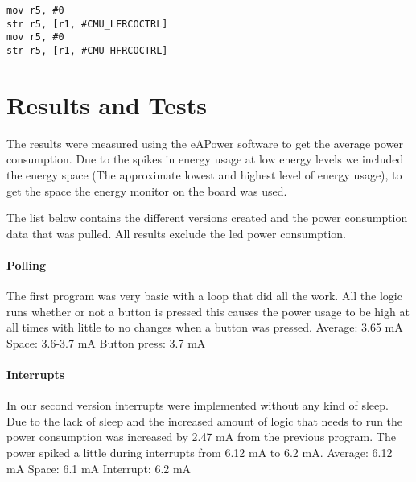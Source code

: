\begin{lstlisting}
mov r5, #0
str r5, [r1, #CMU_LFRCOCTRL]
mov r5, #0
str r5, [r1, #CMU_HFRCOCTRL]
\end{lstlisting}

\section{Results and Tests}
\label{sec:restest}
The results were measured using the eAPower software to get the average power consumption. Due to the spikes in energy usage at low energy levels we included the energy space (The approximate lowest and highest level of energy usage), to get the space the energy monitor on the board was used.

The list below contains the different versions created and the power consumption data that was pulled. All results exclude the led power consumption.

\paragraph{Polling}
The first program\cite{polling} was very basic with a loop that did all the work. All the logic runs whether or not a button is pressed this causes the power usage to be high at all times with little to no changes when a button was pressed.\newline\newline
Average: 3.65 mA\newline
Space: 3.6-3.7 mA\newline
Button press: 3.7 mA 

\paragraph{Interrupts}
In our second version\cite{interrupts} interrupts were  implemented without any kind of sleep. Due to the lack of sleep and the increased amount of logic that needs to run the power consumption was increased by 2.47 mA from the previous program. The power spiked a little during interrupts from 6.12 mA to 6.2 mA.\newline\newline
Average: 6.12 mA\newline
Space: 6.1 mA\newline
Interrupt: 6.2 mA

